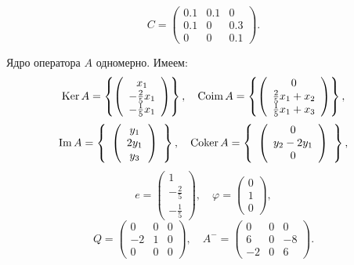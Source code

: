 \[C=\left( \begin{array}{ccc}
0.1 & 0.1 & 0 \\
0.1 & 0 & 0.3 \\
0 & 0 & 0.1 \end{array}
\right).\]

Ядро оператора $A$ одномерно. Имеем:
\[{\rm Ker}\,A=\left\{\left( \begin{array}{c}
x_1 \\
-\frac{2}{5}x_1 \\
-\frac{1}{5}x_1 \end{array}
\right)\right\}, \quad {\rm Coim}\,A=\left\{\left(\begin{array}{c}
0 \\
\frac{2}{5}x_1+x_2 \\
\frac{1}{5}x_1+x_3 \end{array}
\right)\right\},\]
\[{\rm Im}\,A=\left\{ \begin{array}{c}
\left(\begin{array}{c}
y_1 \\
2y_1 \\
y_3 \end{array}
\right) \end{array}
\right\}, \quad {\rm Coker}\,A=\left\{ \begin{array}{c}
\left( \begin{array}{c}
0 \\
y_2-2y_1 \\
0 \end{array}
\right) \end{array}
\right\},\]
\[e=\left( \begin{array}{c}
1 \\
-\frac{2}{5} \\
-\frac{1}{5} \end{array}
\right), \quad \varphi=\left( \begin{array}{c}
0 \\
1 \\
0 \end{array}
\right),\]
\[Q=\left( \begin{array}{ccc}
0 & 0 & 0 \\
-2 & 1 & 0 \\
0 & 0 & 0 \end{array}
\right), \quad A^{-}=\left( \begin{array}{ccc}
0 & 0 & 0 \\
6 & 0 & -8 \\
-2 & 0 & 6 \end{array}
\right).\]

